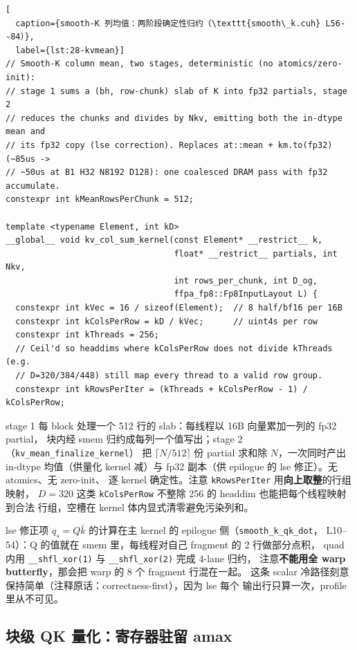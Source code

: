 \begin{lstlisting}[
  caption={smooth-K 列均值：两阶段确定性归约（\texttt{smooth\_k.cuh} L56--84）},
  label={lst:28-kvmean}]
// Smooth-K column mean, two stages, deterministic (no atomics/zero-init):
// stage 1 sums a (bh, row-chunk) slab of K into fp32 partials, stage 2
// reduces the chunks and divides by Nkv, emitting both the in-dtype mean and
// its fp32 copy (lse correction). Replaces at::mean + km.to(fp32) (~85us ->
// ~50us at B1 H32 N8192 D128): one coalesced DRAM pass with fp32 accumulate.
constexpr int kMeanRowsPerChunk = 512;

template <typename Element, int kD>
__global__ void kv_col_sum_kernel(const Element* __restrict__ k,
                                  float* __restrict__ partials, int Nkv,
                                  int rows_per_chunk, int D_og,
                                  ffpa_fp8::Fp8InputLayout L) {
  constexpr int kVec = 16 / sizeof(Element);  // 8 half/bf16 per 16B
  constexpr int kColsPerRow = kD / kVec;      // uint4s per row
  constexpr int kThreads = 256;
  // Ceil'd so headdims where kColsPerRow does not divide kThreads (e.g.
  // D=320/384/448) still map every thread to a valid row group.
  constexpr int kRowsPerIter = (kThreads + kColsPerRow - 1) / kColsPerRow;
\end{lstlisting}

stage 1 每 block 处理一个 512 行的 slab：每线程以 16B 向量累加一列的 fp32 partial，
块内经 smem 归约成每列一个值写出；stage 2（\texttt{kv\_mean\_finalize\_kernel}）
把 $\lceil N/512\rceil$ 份 partial 求和除 $N$，一次同时产出 in-dtype 均值（供量化
kernel 减）与 fp32 副本（供 epilogue 的 lse 修正）。无 atomics、无 zero-init、
逐 kernel 确定性。注意 \texttt{kRowsPerIter} 用\textbf{向上取整}的行组映射，
$D=320$ 这类 \texttt{kColsPerRow} 不整除 256 的 headdim 也能把每个线程映射到合法
行组，空槽在 kernel 体内显式清零避免污染列和。

lse 修正项 $q_s = Q\bar k$ 的计算在主 kernel 的 epilogue 侧（\texttt{smooth\_k\_qk\_dot}，
L10--54）：Q 的值就在 smem 里，每线程对自己 fragment 的 2 行做部分点积，
quad 内用 \texttt{\_\_shfl\_xor(1)} 与 \texttt{\_\_shfl\_xor(2)} 完成 4-lane 归约，
注意\textbf{不能用全 warp butterfly}，那会把 warp 的 8 个 fragment 行混在一起。
这条 scalar 冷路径刻意保持简单（注释原话：correctness-first），因为 lse 每个
输出行只算一次，profile 里从不可见。

\subsection{块级 QK 量化：寄存器驻留 amax}\label{sec:28-quant-block}

